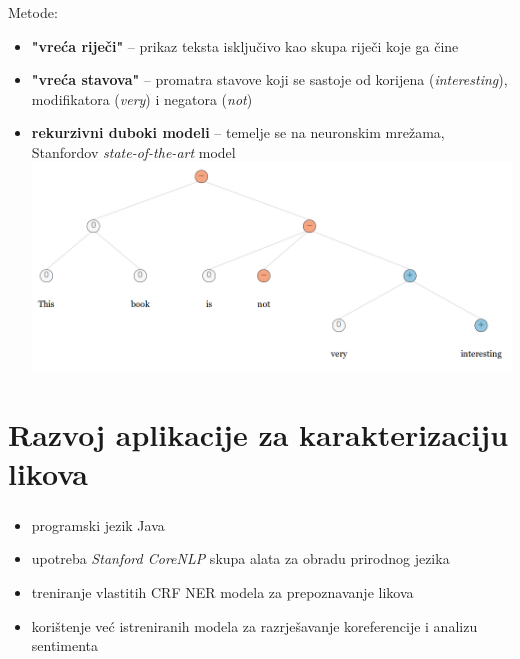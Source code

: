 \documentclass[t, xcolor={usenames,dvipsnames,svgnames,table}]{beamer}
\begin{document}
	\begin{frame}
		\frametitle{\secname}
		
		Metode:
		\begin{itemize}
			\item 	\textbf{"vreća riječi"} -- prikaz teksta isključivo kao skupa riječi koje ga čine
			
			\item 	\textbf{"vreća stavova"} -- promatra stavove koji se sastoje od korijena (\textit{interesting}), modifikatora (\textit{very}) i negatora (\textit{not})
			
			\item	\textbf{rekurzivni duboki modeli} -- temelje se na neuronskim mrežama, Stanfordov \textit{state-of-the-art} model \\
			\includegraphics[scale = 0.35]{sentiment_treebank.png}
			
		\end{itemize}
		
	\end{frame}

\section{Razvoj aplikacije za karakterizaciju likova}
	\emph{}
	\begin{frame}
		\sectionpage
	\end{frame}
	
	\begin{frame}
		\frametitle{\secname}
		
		\begin{itemize}
			\item	programski jezik Java
			\item	upotreba \textit{Stanford CoreNLP} skupa alata za obradu prirodnog jezika
			\item 	treniranje vlastitih CRF NER modela za prepoznavanje likova
			\item 	korištenje već istreniranih modela za razrješavanje koreferencije i analizu sentimenta
		\end{itemize}
	\end{frame}
	
\end{document}
